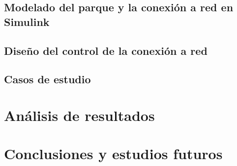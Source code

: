 \documentclass{book}
\begin{document}
	\section{Modelado del parque y la conexi\'on a red en Simulink}

	\section{Diseño del control de la conexi\'on a red}

	\section{Casos de estudio}

\chapter{An\'alisis de resultados}


\chapter{Conclusiones y estudios futuros}



\end{document}

